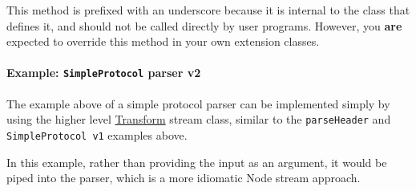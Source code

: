 This method is prefixed with an underscore because it is internal to the
class that defines it, and should not be called directly by user
programs. However, you \textbf{are} expected to override this method in
your own extension classes.

\paragraph{Example: \texttt{SimpleProtocol} parser
v2}\label{example-simpleprotocol-parser-v2}

The example above of a simple protocol parser can be implemented simply
by using the higher level
\hyperref[streamux5fclassux5fstreamux5ftransform]{Transform} stream
class, similar to the \texttt{parseHeader} and
\texttt{SimpleProtocol v1} examples above.

In this example, rather than providing the input as an argument, it
would be piped into the parser, which is a more idiomatic Node stream
approach.

